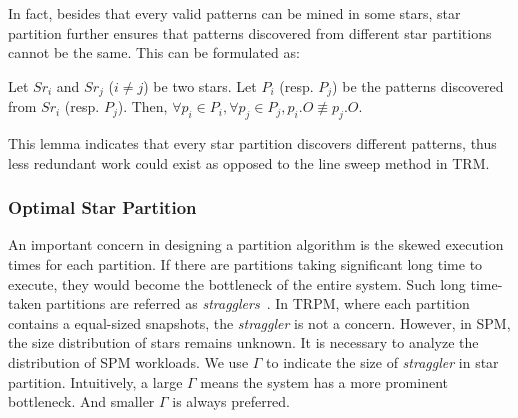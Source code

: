 In fact, besides that every valid patterns can be
mined in some stars, star partition further ensures
that patterns discovered
from different star partitions cannot be the same. 
This can be formulated as:

\begin{lemma}
\label{LEM:SPM_CORRECT}
Let $Sr_i$ and $Sr_j$ ($i\neq j$) be two stars. Let $P_i$ (resp. $P_j$) be 
the patterns discovered from $Sr_i$ (resp. $P_j$). 
Then, $\forall p_i \in P_i, \forall p_j \in P_j, p_i.O \not\equiv p_j.O$.
\end{lemma}

This lemma indicates that every star partition discovers different patterns,
thus less redundant work could exist as opposed to the line sweep method in TRM.

\subsubsection{Optimal Star Partition}
An important concern in designing a partition 
algorithm is the skewed execution times for
each partition. If there are partitions
taking significant long time to execute, they would become
the bottleneck of the entire system. Such long time-taken partitions
are referred as \emph{stragglers}~\cite{kwon2012skewtune,xin2013shark,coppa2015data}. In TRPM, where
each partition contains a equal-sized snapshots, the \emph{straggler}
is not a concern. However, in SPM, the size distribution of
stars remains unknown. It is necessary to analyze the 
distribution of SPM workloads. We use $\Gamma$ to indicate
the size of \emph{straggler} in star partition. Intuitively,
a large $\Gamma$ means the system has a more prominent bottleneck. 
And smaller $\Gamma$ is always preferred.


%

%



